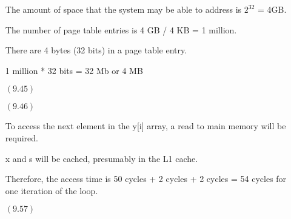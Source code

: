 \documentclass[letterpaper,10pt,titlepage]{article}
\begin{document}
\begin{enumerate}
  The amount of space that the system may be able to address is $2^{32}$ = 4GB.
  
  The number of page table entries is 4 GB / 4 KB = 1 million.
  
  There are 4 bytes (32 bits) in a page table entry.
  
  1 million * 32 bits = 32 Mb or 4 MB

\item[$(9.45)$]

\item[$(9.46)$]

  To access the next element in the y[i] array, a read to main memory will be required.
  
  x and s will be cached, presumably in the L1 cache.
  
  Therefore, the access time is 50 cycles + 2 cycles + 2 cycles = 54 cycles for one iteration of the loop.

\item[$(9.57)$]
  
\begin{lstlisting}
\end{lstlisting}
  
\end{enumerate}
\end{document}
